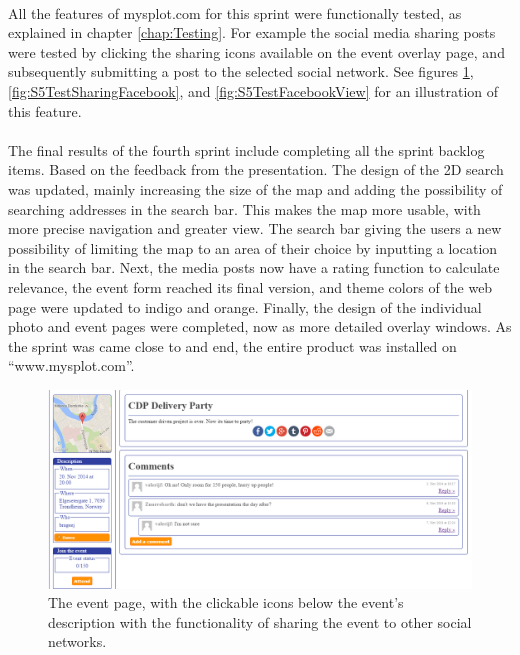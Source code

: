 \paragraph{} All the features of mysplot.com for this sprint were functionally tested, as explained in chapter \ref{chap:Testing}. For example the social media sharing posts were tested by clicking the sharing icons available on the event overlay page, and subsequently submitting a post to the selected social network. See figures \ref{fig:S5TestMediaIconClick}, \ref{fig:S5TestSharingFacebook}, and \ref{fig:S5TestFacebookView} for an illustration of this feature. 

\paragraph{} The final results of the fourth sprint include completing all the sprint backlog items. Based on the feedback from the presentation. The design of the 2D search was updated, mainly increasing the size of the map and adding the possibility of searching addresses in the search bar. This makes the map more usable, with more precise navigation and greater view. The search bar giving the users a new possibility of limiting the map to an area of their choice by inputting a location in the search bar. Next, the media posts now have a rating function to calculate relevance, the event form reached its final version, and theme colors of the web page were updated to indigo and orange. Finally, the design of the individual photo and event pages were completed, now as more detailed overlay windows. As the sprint was came close to and end, the entire product was installed on “www.mysplot.com”.


\begin{figure}[ht!]
  \centering
  \includegraphics[width=\linewidth]{Sprint5/img/test1.png}
  \caption{The event page, with the clickable icons below the event's description with the functionality of sharing the event to other social networks. }
  \label{fig:S5TestMediaIconClick}
\end{figure}

